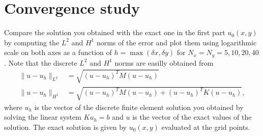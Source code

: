 \documentclass[unicode,11pt,a4paper,oneside,numbers=endperiod,openany]{scrartcl}
\begin{document}
\section{Convergence study}
Compare the solution you obtained with the exact one in the first part $u_0(x,y)$ by computing the 
$L^2$ and $H^1$ norms of the error and plot them using logarithmic scale on both axes
as a function of $h = \max{(\delta x, \delta y)}$ for $N_x = N_y = 5,10,20,40$.
Note that the discrete $L^2$ and $H^1$ norms are easilly obtained from
\begin{align*}
\|u - u_h\|_{L^2} &= \sqrt{(u-u_h)^T M (u-u_h)} \\
\|u - u_h\|_{H^1} &= \sqrt{(u-u_h)^T M (u-u_h) + (u-u_h)^T K (u-u_h)},
\end{align*}
where $u_h$ is the vector of the discrete finite element solution you 
obtained by solving the linear system $K u_h = b$ and $u$ is the vector
of the exact values of the solution. The exact solution
is given by $u_0(x,y)$ evaluated at the grid points.

\end{document}
